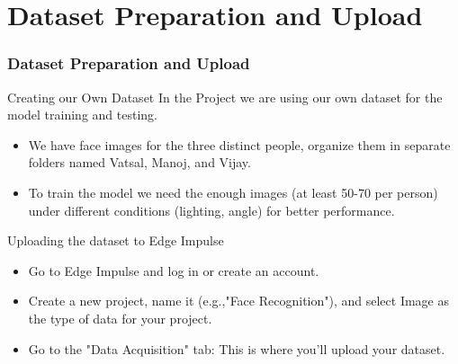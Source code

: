 \documentclass[10pt, a4paper]{beamer}
\begin{document}
	\section{Dataset Preparation and Upload}
	\begin{frame}
		
	
		\frametitle{Dataset Preparation and Upload}
		
		\begin{block}{Creating our Own Dataset}
			In the Project we are using our own dataset for the model training and testing.
			\begin{itemize}
				\item We have face images for the three distinct people, organize them in separate folders named Vatsal, Manoj, and Vijay.
				\item To train the model we need the enough images (at least 50-70 per person) under different conditions (lighting, angle) for better performance.
			\end{itemize}
		\end{block}
		
		\begin{block}{Uploading the dataset to Edge Impulse}
			\begin{itemize}
				\item Go to Edge Impulse and log in or create an account.
				\item Create a new project, name it (e.g.,"Face Recognition"), and select Image as the type of data for your project.
				\item Go to the "Data Acquisition" tab: This is where you'll upload your dataset.
				
			\end{itemize}
			
		\end{block}
	\end{frame}
	
\end{document}
